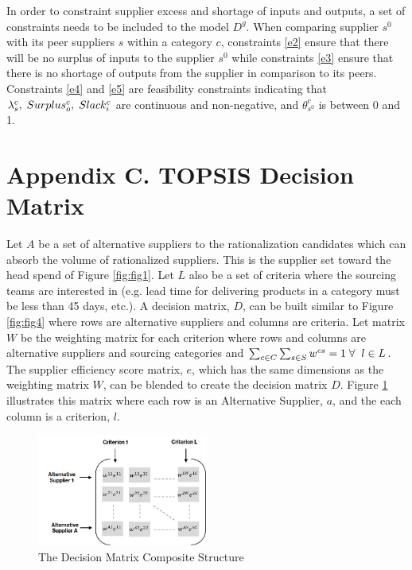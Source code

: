 \documentclass[inte,nonblindrev]{informs3} %
\begin{document}
\begin{APPENDICES}
In order to constraint supplier excess and shortage of inputs and outputs, a set of constraints needs to be included to the model $D^{g}$. When comparing supplier $s^0$ with its peer suppliers $s$ within a category $c$, constraints \eqref{e2} ensure that there will be no surplus of inputs to the supplier $s^0$  while constraints \eqref{e3} ensure that there is no shortage of outputs from the supplier in comparison to its peers. Constraints \eqref{e4} and \eqref{e5} are feasibility constraints indicating that $\lambda_{s}^{c}, \hspace{1 mm} Surplus_{o}^{c}, \hspace{1 mm} Slack_{i}^{c}$ are continuous and non-negative, and $\theta_{s^0}^{c}$ is between 0 and 1.\\

\section{Appendix C. TOPSIS Decision Matrix}
Let $A$ be a set of alternative suppliers to the rationalization candidates which can absorb the volume of rationalized suppliers. This is the supplier set toward the head spend of Figure \ref{fig:fig1}. Let $L$ also be a set of criteria where the sourcing teams are interested in (e.g. lead time for delivering products in a category must be less than 45 days, etc.). A decision matrix, $D$, can be built similar to Figure \ref{fig:fig4} where rows are alternative suppliers and columns are criteria. Let matrix $W$ be the weighting matrix for each criterion where rows and columns are alternative suppliers and sourcing categories and $\sum_{c \in C} \sum_{s \in S}{w^{cs}}= 1 \hspace{1 mm} \forall \hspace{2 mm} l \in L$. The supplier efficiency score matrix, $e$, which has the same dimensions as the weighting matrix $W$, can be blended to create the decision matrix $D$. Figure \ref{fig:figDM} illustrates this matrix where each row is an Alternative Supplier, $a$, and the each column is a criterion, $l$.  

\begin{figure}
	\includegraphics[width=0.5\textwidth]{DecisionMatrix.jpg}
    \caption{The Decision Matrix Composite Structure}
    \label{fig:figDM}
\end{figure}

\end{APPENDICES}
\end{document}
